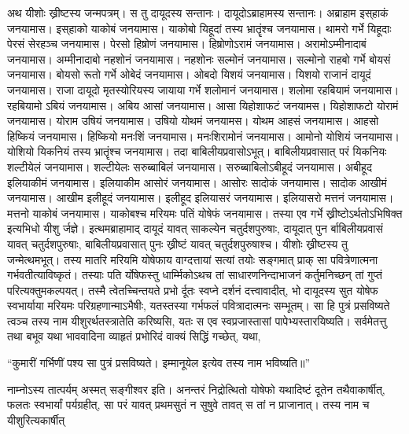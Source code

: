\adhyAya
{}
\vakya अथ यीशोः ख्रीष्टस्य जन्मपत्रम्। स तु दायूदस्य सन्तानः। दायूदोऽब्राहामस्य सन्तानः।
\vakya अब्राहाम इस्‌हाकं जनयामास। इस्‌हाको याकोबं जनयामास। याकोबो यिहूदां तस्य भ्रातॄंश्च जनयामास।
\vakya थामरो गर्भे यिहूदाः पेरसं सेरहञ्च जनयामास। पेरसो हिष्रोणं जनयामास। हिष्रोणोऽरामं जनयामास।
\vakya अरामोऽम्मीनादाबं जनयामास। अम्मीनादाबो नहशोनं जनयामास। नहशोनः सल्मोनं जनयामास।
\vakya सल्मोनो राहबो गर्भे बोयसं जनयामास। बोयसो रूतो गर्भे ओबेदं जनयामास। ओबदो यिशयं जनयामास।
\vakya यिशयो राजानं दायूदं जनयामास। राजा दायूदो मृतस्योरियस्य जायाया गर्भे शलोमानं जनयामास। शलोमा रहबियामं जनयामास।
\vakya रहबियामो ऽबियं जनयामास। अबिय आसां जनयामास।
\vakya आसा यिहोशाफटं जनयामस। यिहोशाफटो योरामं जनयामास। योराम उषियं जनयामास। उषियो योथमं जनयामस।
\vakya योथम आहसं जनयामास। आहसो हिष्कियं जनयामास।
\vakya हिष्कियो मनःशिं जनयामास। मनःशिरामोनं जनयामास।
\vakya आमोनो योशियं जनयामास। योशियो यिकनियं तस्य भ्रातॄंश्च जनयामास। तदा बाबिलीयप्रवासोऽभूत्। बाबिलीयप्रवासात् परं यिकनियः शल्टीयेलं जनयामास।
\vakya शल्टीयेलः सरुब्बाबिलं जनयामास। सरुब्बाबिलोऽबीहूदं जनयामास।
\vakya अबीहूद इलियाकीमं जनयामास। इलियाकीम आसोरं जनयामास। आसोरः सादोकं जनयामास। सादोक आखीमं जनयामास।
\vakya आखीम इलीहूदं जनयामास। इलीहूद इलियासरं जनयामास।
\vakya इलियासरो मत्तनं जनयामास। मत्तनो याकोबं जनयामास। याकोबश्च मरियमः पतिं योषेफं जनयामास।
\vakya तस्या एव गर्भे ख्रीष्टोऽर्थतोऽभिषिक्त इत्यभिधो यीशु र्जज्ञे।
\vakya इत्थमब्राहामाद् दायूदं यावत् साकल्येन चतुर्दशपुरुषाः, दायूदात् पुन र्बाबिलीयप्रवासं यावत् चतुर्दशपुरुषाः, बाबिलीयप्रवासात् पुनः ख्रीष्टं यावत् चतुर्दशपुरुषाश्च।
\vakya यीशोः ख्रीष्टस्य तु जन्मेत्थमभूत्। तस्य मातरि मरियमि योषेफाय वाग्दत्तायां सत्यां तयोः सङ्गमात् प्राक् सा पवित्रेणात्मना गर्भवतीत्याविष्कृतं।
\vakya तस्याः पति र्योषेफस्तु धार्म्मिकोऽथच तां साधारणनिन्दाभाजनं कर्तुमनिच्छन् तां गुप्तं परित्यक्तुमकल्पयत्। तस्मै त्वेतच्चिन्तयते प्रभो र्दूतः स्वप्ने दर्शनं दत्त्वावादीत्,
\vakya भो दायूदस्य सुत योषेफ स्वभार्याया मरियमः परिग्रहणान्माऽभैषीः, यतस्तस्या गर्भफलं पवित्रादात्मनः सम्भूतम्।
\vakya सा हि पुत्रं प्रसविष्यते त्वञ्च तस्य नाम यीशुरर्थतस्त्रातेति करिष्यसि, यतः स एव स्वप्रजास्तासां पापेभ्यस्तारयिष्यति।
\vakya सर्वमेतत्तु तथा बभूव यथा भाववादिना व्याहृतं प्रभोरिदं वाक्यं सिद्धिं गच्छेत्, यथा,
\begin{poem}
\startwithvakya “कुमारीं गर्भिणीं पश्य सा पुत्रं प्रसविष्यते।
\pline इम्मानूयेल इत्येव तस्य नाम भविष्यति॥”
\end{poem}
\vakya नाम्नोऽस्य तात्पर्यम् अस्मत् सङ्गीश्वर इति। अनन्तरं निद्रोत्थितो योषेफो यथादिष्टं दूतेन तथैवाकार्षीत्, फलतः स्वभार्यां पर्यग्रहीत्,
\vakya सा परं यावत् प्रथमसुतं न सुषुवे तावत् स तां न प्राजानात्। तस्य नाम च यीशुरित्यकार्षीत्\eoc
